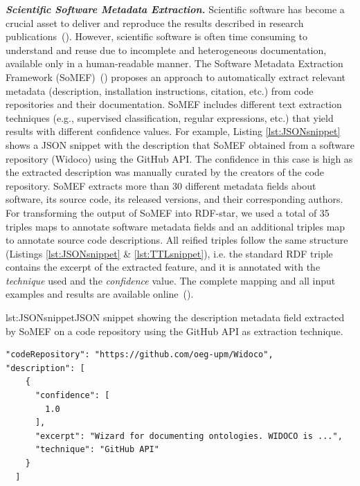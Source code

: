 \noindent\textbf{\textit{Scientific Software Metadata Extraction.}}
Scientific software has become a crucial asset to deliver and reproduce the results described in research publications~(\cite{chue_hong_fair_2021}). However, scientific software is often time consuming to understand and reuse due to incomplete and heterogeneous documentation, available only in a human-readable manner.
The Software Metadata Extraction Framework (SoMEF)~(\cite{somef}) proposes an approach to automatically extract relevant metadata (description, installation instructions, citation, etc.) from code repositories and their documentation. SoMEF includes different text extraction techniques (e.g., supervised classification, regular expressions, etc.) that yield results with different confidence values.
For example, Listing \ref{lst:JSONsnippet} shows a JSON snippet with the description that SoMEF obtained from a software repository (Widoco) using the GitHub API.
The confidence in this case is high as the extracted description was manually curated by the creators of the code repository.
SoMEF extracts more than 30 different metadata fields about 
software, its source code, its released versions, and their corresponding authors. For transforming the output of SoMEF into RDF-star, we used a total of 35 triples maps to annotate software metadata fields and an additional triples map to annotate source code descriptions. All reified triples follow the same structure (Listings \ref{lst:JSONsnippet} \& \ref{lst:TTLsnippet}), i.e. the standard RDF triple contains the excerpt of the extracted feature, and it is annotated
with the \emph{technique} used and the \emph{confidence} value. 
The complete mapping and all input examples and results are available online~(\cite{david_chaves_2022_6919707}).
 
\noindent\hspace{0.1\linewidth}\begin{minipage}{0.8\linewidth}
\begin{captionedlisting}{lst:JSONsnippet}{JSON snippet showing the description metadata field extracted by SoMEF on a code repository using the GitHub API as extraction technique.}
\centering
\hspace{3em}
{
\begin{lstlisting}[basicstyle=\ttfamily\small,label={list:example1},columns=flexible]
"codeRepository": "https://github.com/oeg-upm/Widoco",
"description": [ 
    {
      "confidence": [
        1.0
      ],
      "excerpt": "Wizard for documenting ontologies. WIDOCO is ...",
      "technique": "GitHub API"
    }
  ]  
\end{lstlisting}
}
\end{captionedlisting}
\end{minipage}

